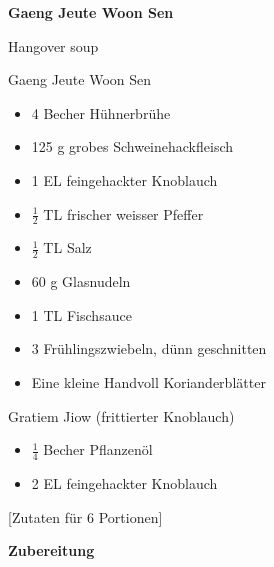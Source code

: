 
\parindent0pt	

\pagestyle{empty}


\textbf{{\LARGE Gaeng Jeute Woon Sen}}%


\hrulefill

Hangover soup
\vspace*{\fill}
\begin{multicols}{2}	

Gaeng Jeute Woon Sen %
\begin{itemize}
\item 4 Becher Hühnerbrühe%
\item 125 g grobes Schweinehackfleisch%
\item 1 EL feingehackter Knoblauch%
\item $\frac{1}{2}$ TL frischer weisser Pfeffer%
\item $\frac{1}{2}$ TL Salz
\item 60 g Glasnudeln
\item 1 TL Fischsauce
\item 3 Frühlingszwiebeln, dünn geschnitten %
\item Eine kleine Handvoll Korianderblätter%
\end{itemize}
Gratiem Jiow (frittierter Knoblauch)%
\begin{itemize}
\item $\frac{1}{4}$ Becher Pflanzenöl%
\item 2 EL feingehackter Knoblauch
\end{itemize}

\end{multicols}


\vspace{1cm}
\begin{center}
[Zutaten für 6 Portionen]
\end{center}



\vfill
\newpage
\textbf{{\LARGE Zubereitung}}%

